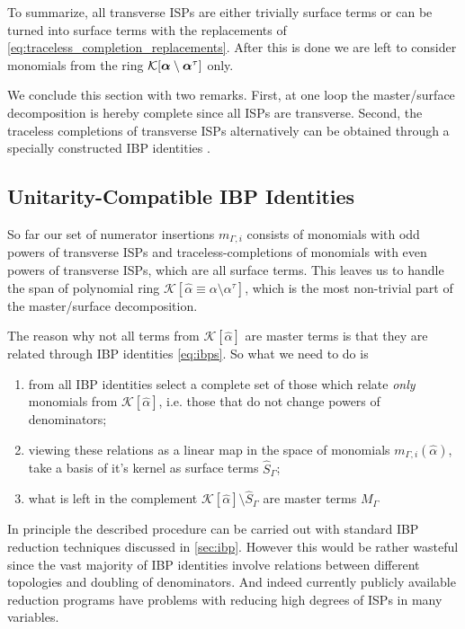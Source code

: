 To summarize, all transverse ISPs are either trivially surface terms or can be turned into surface terms with the replacements of \cref{eq:traceless_completion_replacements}.
After this is done we are left to consider monomials from the ring $\mathcal{K}[\vb*{\alpha}\setminus\vb*{\alpha}^\tau]$ only.


We conclude this section with two remarks.
First, at one loop the master/surface decomposition is hereby complete since all ISPs are transverse.
Second, the traceless completions of transverse ISPs alternatively
can be obtained through a specially constructed IBP identities \cite{Ita:2015tya}.



\subsection{Unitarity-Compatible IBP Identities}
So far our set of numerator insertions $m_{\Gamma,i}$ consists of monomials with odd powers of transverse ISPs and traceless-completions of
monomials with even powers of transverse ISPs, which are all surface terms.
This leaves us to handle the span of polynomial ring $\mathcal{K}[\hat{\alpha}\equiv \alpha\setminus\alpha^\tau]$,
which is the most non-trivial part of the master/surface decomposition.

The reason why not all terms from $\mathcal{K}[\hat{\alpha}]$ are master terms is that they are
related through IBP identities \eqref{eq:ibps}. So what we need to do is
\begin{enumerate}
  \item from all IBP identities select a complete set of those which relate
    \emph{only} monomials from $\mathcal{K}[\hat{\alpha}]$, i.e. those that do not change powers of denominators; \label{item1}
  \item viewing these relations as a linear map in the space of monomials $m_{\Gamma,i}(\hat{\alpha})$, take
    a basis of it's kernel as surface terms $\hat{S}_\Gamma$;
  \item what is left in the complement $\mathcal{K}[\hat{\alpha}]\setminus \hat{S}_\Gamma$ are master terms $M_\Gamma$
\end{enumerate}

In principle the described procedure can be carried out with standard IBP reduction techniques discussed in \cref{sec:ibp}.
However this would be rather wasteful
since the vast majority of IBP identities involve relations between different topologies and doubling of denominators.
And indeed currently publicly available reduction programs
\cite{Studerus:2009ye,vonManteuffel:2012np, Smirnov:2008iw,Smirnov:2014hma, Lee:2012cn,Lee:2013mka, Maierhoefer:2017hyi,Maierhofer:2018gpa}
have problems with reducing high degrees of ISPs in many variables.

